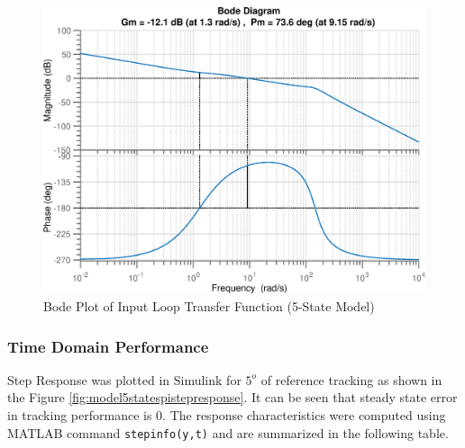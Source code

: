 \documentclass[12pt]{article}
\begin{document}
	\begin{figure}[H]
		\centering
		\includegraphics[width=0.75\linewidth]{bode_5states1}
		\caption{Bode Plot of Input Loop Transfer Function (5-State Model)}
		\label{fig:bode_5states1}
	\end{figure}
	
	\subsubsection{Time Domain Performance}
	Step Response was plotted in Simulink for $5^{o}$ of reference tracking as shown in the Figure \ref{fig:model5statespistepresponse}. It can be seen that steady state error in tracking performance is 0. The response characteristics were computed using MATLAB command \texttt{stepinfo(y,t)} and are summarized in the following table. 
	
\end{document}
